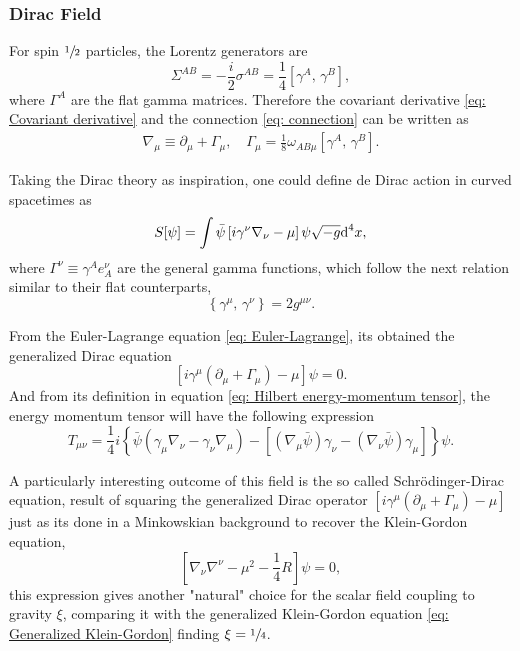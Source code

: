 \subsubsection{Dirac Field}
For spin $\sfrac{1}{2}$ particles, the Lorentz generators are
\begin{equation}
	\Sigma^{AB}=-\frac{i}{2}\sigma^{AB}=\frac{1}{4}\left[\gamma^A,\,\gamma^B\right],
\end{equation}
where $\Gamma^A$ are the flat gamma matrices. Therefore the covariant derivative \ref{eq: Covariant derivative} and the connection \ref{eq: connection} can be written as
\begin{subequations}
	\begin{gather}
		\nabla_\mu\equiv\partial_\mu+\Gamma_\mu,\quad \Gamma_\mu=\frac{1}{8}\omega_{AB\mu}\left[\gamma^A,\,\gamma^B\right].
	\end{gather}
\end{subequations}

Taking the Dirac theory as inspiration, one could define de Dirac action in curved spacetimes as
\begin{equation}
	S[\psi]=\int \bar{\psi}\left[i\gamma^\nu\nabla_\nu-\mu\right]\psi\sqrt{-g}\text{d}^4x,
\end{equation}
where $\Gamma^\nu\equiv \gamma^Ae^\nu_A$ are the general gamma functions, which follow the next relation similar to their flat counterparts,
\begin{equation}
	\left\{\gamma^\mu,\,\gamma^\nu\right\}=2g^{\mu\nu}.
\end{equation}

From the Euler-Lagrange equation \ref{eq: Euler-Lagrange}, its obtained the generalized Dirac equation
\begin{equation}
	\left[i\gamma^\mu\left(\partial_\mu+\Gamma_\mu\right)-\mu\right]\psi=0.
\end{equation}
And from its definition in equation \ref{eq: Hilbert energy-momentum tensor}, the energy momentum tensor will have the following expression
\begin{equation}
	T_{\mu\nu}=\frac{1}{4}i\left\{\bar{\psi}\left(\gamma_\mu\nabla_\nu-\gamma_\nu\nabla_\mu\right)-\left[\left(\nabla_\mu\bar{\psi}\right)\gamma_\nu-\left(\nabla_\nu\bar{\psi}\right)\gamma_\mu\right]\right\}\psi.
\end{equation}

A particularly interesting outcome of this field is the so called Schrödinger-Dirac equation, result of squaring the generalized Dirac operator $\left[i\gamma^\mu\left(\partial_\mu+\Gamma_\mu\right)-\mu\right]$ just as its done in a Minkowskian background to recover the Klein-Gordon equation,
\begin{equation}
	\left[\nabla_\nu\nabla^\nu-\mu^2-\frac{1}{4}R\right]\psi=0,
\end{equation}
this expression gives another "natural" choice for the scalar field coupling to gravity $\xi$, comparing it with the generalized Klein-Gordon equation \ref{eq: Generalized Klein-Gordon} finding $\xi=\sfrac{1}{4}$.

